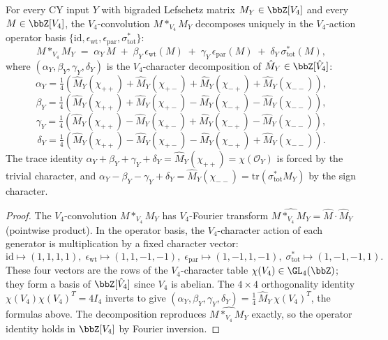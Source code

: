 \begin{theorem}
\label{thm:universal-drinfeld-coupling-all-Y}
\ClaimStatusProvedHere
For every CY input $Y$ with bigraded Lefschetz matrix $M_Y \in \bbZ[V_4]$ and
every $M \in \bbZ[V_4]$, the $V_4$-convolution $M *_{V_4} M_Y$ decomposes
uniquely in the $V_4$-action operator basis $\{\mathrm{id},
\epsilon_{\mathrm{wt}}, \epsilon_{\mathrm{par}}, \sigma_{\mathrm{tot}}^*\}$:
\[
 \boxed{\;
 M *_{V_4} M_Y
 \;=\; \alpha_Y\, M
 \;+\; \beta_Y\, \epsilon_{\mathrm{wt}}(M)
 \;+\; \gamma_Y\, \epsilon_{\mathrm{par}}(M)
 \;+\; \delta_Y\, \sigma_{\mathrm{tot}}^*(M),
 \;}
\]
where $(\alpha_Y, \beta_Y, \gamma_Y, \delta_Y)$ is the $V_4$-character
decomposition of $\hat M_Y \in \bbZ[\hat V_4]$:
\[
 \alpha_Y = \tfrac{1}{4}(\hat M_Y(\chi_{++}) + \hat M_Y(\chi_{+-})
 + \hat M_Y(\chi_{-+}) + \hat M_Y(\chi_{--})),
\]
\[
 \beta_Y = \tfrac{1}{4}(\hat M_Y(\chi_{++}) + \hat M_Y(\chi_{+-})
 - \hat M_Y(\chi_{-+}) - \hat M_Y(\chi_{--})),
\]
\[
 \gamma_Y = \tfrac{1}{4}(\hat M_Y(\chi_{++}) - \hat M_Y(\chi_{+-})
 + \hat M_Y(\chi_{-+}) - \hat M_Y(\chi_{--})),
\]
\[
 \delta_Y = \tfrac{1}{4}(\hat M_Y(\chi_{++}) - \hat M_Y(\chi_{+-})
 - \hat M_Y(\chi_{-+}) + \hat M_Y(\chi_{--})).
\]
The trace identity $\alpha_Y + \beta_Y + \gamma_Y + \delta_Y =
\hat M_Y(\chi_{++}) = \chi(\mathcal{O}_Y)$ is forced by the trivial
character, and $\alpha_Y - \beta_Y - \gamma_Y + \delta_Y = \hat M_Y(\chi_{--})
= \mathrm{tr}(\sigma_{\mathrm{tot}}^* M_Y)$ by the sign character.
\end{theorem}

\begin{proof}
The $V_4$-convolution $M *_{V_4} M_Y$ has $V_4$-Fourier transform
$\widehat{M *_{V_4} M_Y} = \hat M \cdot \hat M_Y$ (pointwise product). In the
operator basis, the $V_4$-character action of each generator is multiplication
by a fixed character vector:
\[
 \mathrm{id} \mapsto (1, 1, 1, 1), \;
 \epsilon_{\mathrm{wt}} \mapsto (1, 1, -1, -1), \;
 \epsilon_{\mathrm{par}} \mapsto (1, -1, 1, -1), \;
 \sigma_{\mathrm{tot}}^* \mapsto (1, -1, -1, 1).
\]
These four vectors are the rows of the $V_4$-character table $\chi(V_4) \in
\GL_4(\bbZ)$; they form a basis of $\bbZ[\hat V_4]$ since $V_4$ is abelian.
The $4 \times 4$ orthogonality identity $\chi(V_4) \chi(V_4)^T = 4 I_4$ inverts
to give $(\alpha_Y, \beta_Y, \gamma_Y, \delta_Y) = \tfrac{1}{4}\,\hat M_Y\,
\chi(V_4)^T$, the formulas above. The decomposition reproduces
$\widehat{M *_{V_4} M_Y}$ exactly, so the operator identity holds in
$\bbZ[V_4]$ by Fourier inversion.
\end{proof}

